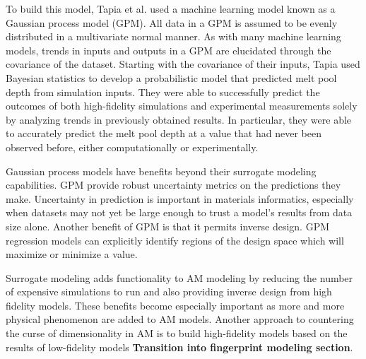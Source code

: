 To build this model, Tapia et al. used a machine learning model known as a Gaussian process model (GPM). All data in a GPM is assumed to be evenly distributed in a multivariate normal manner. As with many machine learning models, trends in inputs and outputs in a GPM are elucidated through the covariance of the dataset. Starting with the covariance of their inputs, Tapia used Bayesian statistics to develop a probabilistic model that predicted melt pool depth from simulation inputs. They were able to successfully predict the outcomes of both high-fidelity simulations and experimental measurements solely by analyzing trends in previously obtained results. In particular, they were able to accurately predict the melt pool depth at a value that had never been observed before, either computationally or experimentally. 

Gaussian process models have benefits beyond their surrogate modeling capabilities. GPM provide robust uncertainty metrics on the predictions they make. Uncertainty in prediction is important in materials informatics, especially when datasets may not yet be large enough to trust a model's results from data size alone. Another benefit of GPM is that it permits inverse design. GPM regression models can explicitly identify regions of the design space which will maximize or minimize a value.

Surrogate modeling adds functionality to AM modeling by reducing the number of expensive simulations to run and also providing inverse design from high fidelity models. These benefits become especially important as more and more physical phenomenon are added to AM models. Another approach to countering the curse of dimensionality in AM is to build high-fidelity models based on the results of low-fidelity models \textbf{Transition into fingerprint modeling section}.